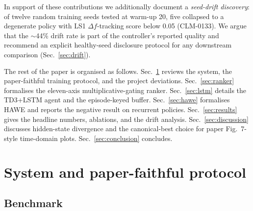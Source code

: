 \documentclass[journal,onecolumn,11pt]{IEEEtran}
\begin{document}
In support of these contributions we additionally document a
\emph{seed-drift discovery}: of twelve random training seeds tested at
warm-up 20, five collapsed to a degenerate policy with LS1
$\Delta f$-tracking score below 0.05 (CLM-0133). We argue that the
$\sim$44\% drift rate is part of the controller's reported quality and
recommend an explicit healthy-seed disclosure protocol for any
downstream comparison (Sec.~\ref{sec:drift}).

The rest of the paper is organised as follows.
Sec.~\ref{sec:setup} reviews the system, the paper-faithful
training protocol, and the project deviations.
Sec.~\ref{sec:ranker} formalises the eleven-axis multiplicative-gating
ranker. Sec.~\ref{sec:lstm} details the TD3+LSTM agent and the
episode-keyed buffer. Sec.~\ref{sec:hawe} formalises HAWE and reports
the negative result on recurrent policies. Sec.~\ref{sec:results}
gives the headline numbers, ablations, and the drift analysis.
Sec.~\ref{sec:discussion} discusses hidden-state divergence and the
canonical-best choice for paper Fig.~7-style time-domain plots.
Sec.~\ref{sec:conclusion} concludes.

\section{System and paper-faithful protocol}\label{sec:setup}

\subsection{Benchmark}
\end{document}
